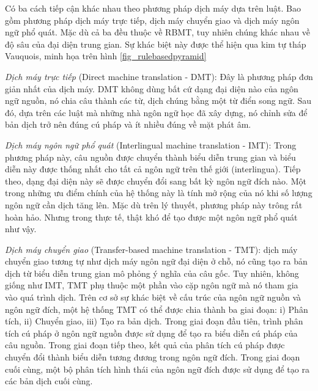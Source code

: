 Có ba cách tiếp cận khác nhau theo phương pháp dịch máy dựa trên luật. Bao gồm phương pháp dịch máy trực tiếp, dịch máy chuyển giao và dịch máy ngôn ngữ phổ quát. Mặc dù cả ba đều thuộc về RBMT, tuy nhiên chúng khác nhau về độ sâu của đại diện trung gian. Sự khác biệt này được thể hiện qua kim tự tháp Vauquois, minh họa trên hình \ref{fig_rulebasedpyramid}

\textit{Dịch máy trực tiếp} (Direct machine translation - DMT): Đây là phương pháp đơn giản nhất của dịch máy. DMT không dùng bất cứ dạng đại diện nào của ngôn ngữ nguồn, nó chia câu thành các từ, dịch chúng bằng một từ điển song ngữ. Sau đó, dựa trên các luật mà những nhà ngôn ngữ học đã xây dựng, nó chỉnh sửa để bản dịch trở nên đúng cú pháp và ít nhiều đúng về mặt phát âm.

\textit{Dịch máy ngôn ngữ phổ quát} (Interlingual machine translation - IMT): Trong phương pháp này, câu nguồn được chuyển thành biểu diễn trung gian và biểu diễn này được thống nhất cho tất cả ngôn ngữ trên thế giới (interlingua). Tiếp theo, dạng đại diện này sẽ được chuyển đổi sang bất kỳ ngôn ngữ đích nào. Một trong những ưu điểm chính của hệ thống này là tính mở rộng của nó khi số lượng ngôn ngữ cần dịch tăng lên. Mặc dù trên lý thuyết, phương pháp này trông rất hoàn hảo. Nhưng trong thực tế, thật khó để tạo được một ngôn ngữ phổ quát như vậy.

\textit{Dịch máy chuyển giao} (Transfer-based machine translation - TMT): dịch máy chuyển giao tương tự như dịch máy ngôn ngữ đại diện ở chỗ, nó cũng tạo ra bản dịch từ biểu diễn trung gian mô phỏng ý nghĩa của câu gốc. Tuy nhiên, không giống như IMT, TMT phụ thuộc một phần vào cặp ngôn ngữ mà nó tham gia vào quá trình dịch. Trên cơ sở sự khác biệt về cấu trúc của ngôn ngữ nguồn và ngôn ngữ đích, một hệ thống TMT có thể được chia thành ba giai đoạn: i) Phân tích, ii) Chuyển giao, iii) Tạo ra bản dịch. Trong giai đoạn đầu tiên, trình phân tích cú pháp ở ngôn ngữ nguồn được sử dụng để tạo ra biểu diễn cú pháp của câu nguồn. Trong giai đoạn tiếp theo, kết quả của phân tích cú pháp được chuyển đổi thành biểu diễn tương đương trong ngôn ngữ đích. Trong giai đoạn cuối cùng, một bộ phân tích hình thái của ngôn ngữ đích được sử dụng để tạo ra các bản dịch cuối cùng.

